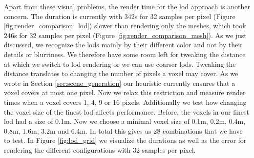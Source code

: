 Apart from these visual problems, the render time for the \ac{lod} approach is another concern.
The duration is currently with 342s for 32 samples per pixel (Figure \ref{fig:render_comparison_lod}) slower than rendering only the meshes, which took 246s for 32 samples per pixel (Figure \ref{fig:render_comparison_mesh}).
As we just discussed, we recognize the \acsp{lod} mainly by their different color and not by their details or blurriness.
We therefore have some room left for tweaking the distance at which we switch to \ac{lod} rendering or we can use coarser \acsp{lod}.
Tweaking the distance translates to changing the number of pixels a voxel may cover.
As we wrote in Section \ref{sec:scene_generation} our heuristic currently ensures that a voxel covers at most one pixel.
Now we relax this restriction and measure render times when a voxel covers 1, 4, 9 or 16 pixels.
Additionally we test how changing the voxel size of the finest \ac{lod} affects performance.
Before, the voxels in our finest \ac{lod} had a size of 0.1m.
Now we choose a minimal voxel size of 0.1m, 0.2m, 0.4m, 0.8m, 1.6m, 3.2m and 6.4m.
In total this gives us 28 combinations that we have to test.
In Figure \ref{fig:lod_grid} we visualize the durations as well as the \FLIP error for rendering the different configurations with 32 samples per pixel.
